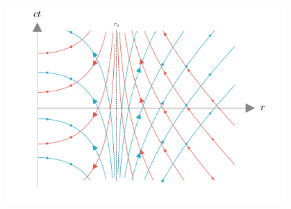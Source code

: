 \begin{figure}[H]
    \begin{small}
        \begin{center}
            \includegraphics[width=0.95\textwidth]{AgujerosNegros/Schwarzschild/media/images/rayos_Luz_Schwarzschild_ManimCE_v0.19.0.png}
        \end{center}
        \caption{}
        \label{fig:lightraysSchwarzschild}
    \end{small}
\end{figure}

